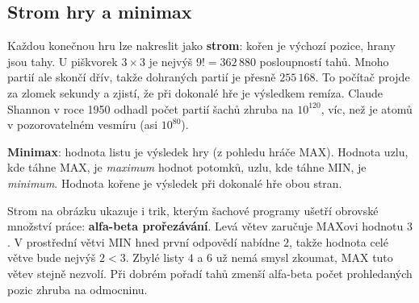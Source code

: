 \subsection{Strom hry a minimax}

Každou konečnou hru lze nakreslit jako \textbf{strom}: kořen je výchozí pozice, hrany jsou tahy. U piškvorek $3\times 3$ je nejvýš $9! = 362\,880$ posloupností tahů. Mnoho partií ale skončí dřív, takže dohraných partií je přesně $255\,168$. To počítač projde za zlomek sekundy a zjistí, že při dokonalé hře je výsledkem remíza. Claude Shannon v roce 1950 odhadl počet partií šachů zhruba na $10^{120}$, víc, než je atomů v pozorovatelném vesmíru (asi $10^{80}$).

\begin{definitionbox}
  \textbf{Minimax}: hodnota listu je výsledek hry (z pohledu hráče MAX). Hodnota uzlu, kde táhne MAX, je \textit{maximum} hodnot potomků, uzlu, kde táhne MIN, je \textit{minimum}. Hodnota kořene je výsledek při dokonalé hře obou stran.
\end{definitionbox}

\begin{center}
\end{center}

Strom na obrázku ukazuje i trik, kterým šachové programy ušetří obrovské množství práce: \textbf{alfa-beta prořezávání}. Levá větev zaručuje MAXovi hodnotu $3$. V prostřední větvi MIN hned první odpovědí nabídne $2$, takže hodnota celé větve bude nejvýš $2 < 3$. Zbylé listy $4$ a $6$ už nemá smysl zkoumat, MAX tuto větev stejně nezvolí. Při dobrém pořadí tahů zmenší alfa-beta počet prohledaných pozic zhruba na odmocninu.

